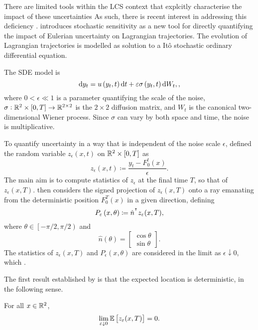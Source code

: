 There are limited tools within the LCS context that explcitly characterise the impact of these uncertainties
As such, there is recent interest in addressing this deficiency \citep{BalasuriyaGottwald_2018_EstimatingStableUnstablea, Balasuriya_2020_StochasticApproachesLagrangian}.
\cite{Balasuriya_2020_StochasticSensitivityComputable} introduces stochastic sensitivity as a new tool for directly quantifying the impact of Eulerian uncertainty on Lagrangian trajectories.
The evolution of Lagrangian trajectories is modelled as solution to a It\^o stochastic ordinary differential equation.


The SDE model is
\begin{equation}
	\sde{y_t}{u\left(y_t, t\right)}{\epsilon\sigma\left(y_t, t\right)},
	\label{eqn:ss_sde},
\end{equation}
where \(0 < \epsilon \ll 1\) is a parameter quantifying the scale of the noise, \(\sigma:	\mathbb{R}^2\times[0,T] \to \mathbb{R}^{2\times 2}\) is the \(2\times 2\) diffusion matrix, and \(W_t\) is the canonical two-dimensional Wiener process.
Since \(\sigma\) can vary by both space and time, the noise is multiplicative.

To quantify uncertainty in a way that is independent of the noise scale \(\epsilon\), \cite{Balasuriya_2020_StochasticSensitivityComputable} defined the random variable \(z_\epsilon\left(x,t\right)\) on \(\mathbb{R}^2 \times [0,T]\) as
\[
	z_\epsilon\left(x,t\right) \coloneqq \frac{y_t - F_0^t(x)}{\epsilon}.
\]
The main aim is to compute statistics of \(z_\epsilon\) at the final time \(T\), so that of \(z_\epsilon\left(x,T\right)\).
\cite{Balasuriya_2020_StochasticSensitivityComputable} then considers the signed projection of \(z_\epsilon\left(x,T\right)\) onto a ray emanating from the deterministic position \(F_0^T(x)\) in a given direction, defining
\[
	P_\varepsilon\left(x,\theta\right) \coloneqq \hat{n}^{^{\intercal}} z_\varepsilon(x,T),
\]
where \(\theta \in \left[-\pi/2, \pi/2\right)\) and
\[
	\hat{n}(\theta) = \begin{bmatrix}
		\cos{\theta} \\
		\sin{\theta}
	\end{bmatrix}.
\]
The statistics of \(z_\epsilon\left(x,T\right)\) and \(P_\epsilon(x,\theta)\) are considered in the limit as \(\epsilon\downarrow 0\), which .

The first result established by \cite{Balasuriya_2020_StochasticSensitivityComputable} is that the expected location is deterministic, in the following sense.
\begin{theorem}
	For all \(x \in \mathbb{R}^2\),
	\[
		\lim_{\varepsilon\downarrow 0}\mathbb{E}\left[z_\varepsilon(x,T)\right] = 0.
	\]
\end{theorem}

